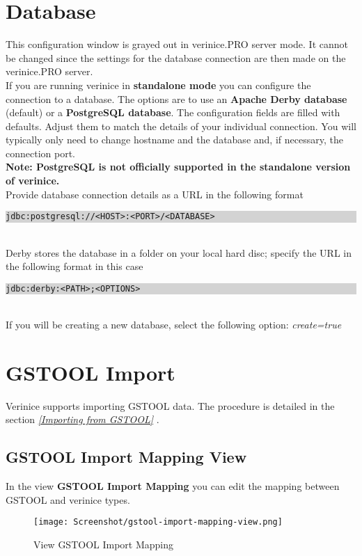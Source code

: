 \documentclass[a4paper,10pt]{book}
\begin{document}
\section{Database}
\label{sec:database}
This configuration window is grayed out in verinice.\textsc{PRO} server mode. It cannot be changed
since the settings for the database connection are then made on the verinice.\textsc{PRO} server.
\newline\\
If you are running verinice in \textbf{standalone mode} you can configure the connection to a database.
The options are to use an \textbf{Apache Derby database} (default) or a \textbf{PostgreSQL database}.
The configuration fields are filled with defaults. Adjust them to match the details of your individual
connection. You will typically only need to change hostname and the database and, if necessary,
the connection port.
\newline\\
\textbf{Note: PostgreSQL is not officially supported in the standalone version of verinice.}
\newline\\
Provide database connection details as a URL in the following format
\newline\\
\colorbox{lightgray}{\parbox{\textwidth}{
{\tt jdbc:postgresql://<HOST>:<PORT>/<DATABASE>}
}}
\newline\\
Derby stores the database in a folder on your local hard disc; specify the URL in the following format in this case
\newline\\
\colorbox{lightgray}{\parbox{\textwidth}{
{\tt jdbc:derby:<PATH>;<OPTIONS>}
}}
\newline\\
If you will be creating a new database, select the following option: {\em create=true}
\section{GSTOOL Import} \label{GSTOOL Import}
Verinice supports importing \textsc{GSTOOL} data. The procedure is detailed in the section
{\em \ref{Importing from GSTOOL} }.

\subsection{GSTOOL Import Mapping View} \label{GSTOOL Import Mapping View}
In the view \textbf{GSTOOL Import Mapping} you can edit the mapping between GSTOOL and verinice types.
\begin{figure}[htb!]
  \centering
  \texttt{[image: Screenshot/gstool-import-mapping-view.png]}
  \caption{\label{View GSTOOL Import Mapping View} View GSTOOL Import Mapping}
\end{figure}
\end{document}
